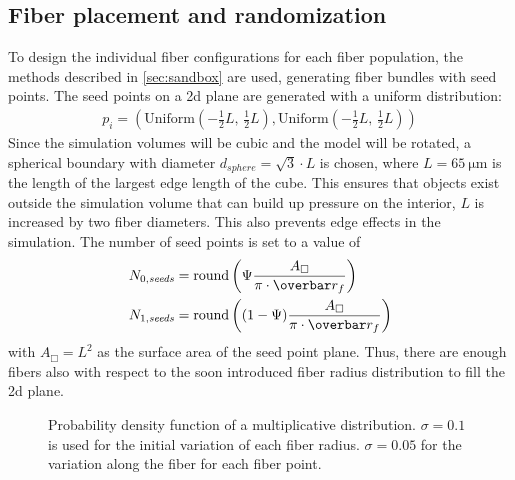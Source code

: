 \subsection{Fiber placement and randomization}
%
To design the individual fiber configurations for each fiber population, the methods described in \cref{sec:sandbox} are used, \ie{} generating fiber bundles with seed points.
The seed points on a 2d plane are generated with a uniform distribution:
\begin{align}
p_i = (\mathrm{Uniform}(-\frac{1}{2}\mathit{L}, \, \frac{1}{2}\mathit{L}), \mathrm{Uniform}(-\frac{1}{2}\mathit{L}, \, \frac{1}{2}\mathit{L}))
\end{align}
Since the simulation volumes will be cubic and the model will be rotated, a spherical boundary with diameter $d_{\mathit{sphere}}=\sqrt{3} \cdot \mathit{L}$ is chosen, where $\mathit{L}=\SI{65}{\micro\meter}$ is the length of the largest edge length of the cube.
This ensures that objects exist outside the simulation volume that can build up pressure on the interior, $\mathit{L}$ is increased by two fiber diameters.
This also prevents edge effects in the simulation.
The number of seed points is set to a value of
\begin{align}
N_{0,\mathit{seeds}} &= \round \left(\modelPsi \frac{A_{\Box}}{\pi \cdot \fiberRadiusMean}\right)\\
N_{1,\mathit{seeds}} &= \round \left((1-\modelPsi) \frac{A_{\Box}}{\pi \cdot \fiberRadiusMean}\right)
\end{align}
with $A_{\Box}=L^2$ as the surface area of the seed point plane.
Thus, there are enough fibers also with respect to the soon introduced fiber radius distribution to fill the 2d plane.
\par
%
\begin{figure}[!t]
\centering
\caption[]{Probability density function of a multiplicative  distribution. $\sigma=0.1$ is used for the initial variation of each fiber radius. $\sigma=0.05$ for the variation along the fiber for each fiber point.}
\label{fig:logNormal}
\end{figure}
